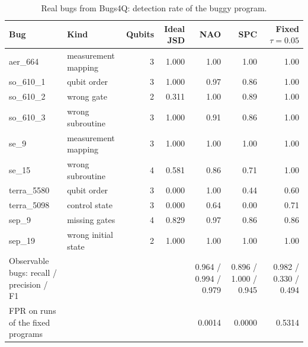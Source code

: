 \begin{table}[t]
\centering
\caption{Real bugs from Bugs4Q: detection rate of the buggy program.}
\label{tab:rq4-realbugs}
\small
\begin{tabular}{llrrrrr}
\toprule
Bug & Kind & Qubits & Ideal JSD & NAO & SPC & Fixed $\tau=0.05$ \\
\midrule
aer\_664 & measurement mapping & 3 & 1.000 & 1.00 & 1.00 & 1.00 \\
so\_610\_1 & qubit order & 3 & 1.000 & 0.97 & 0.86 & 1.00 \\
so\_610\_2 & wrong gate & 2 & 0.311 & 1.00 & 0.89 & 1.00 \\
so\_610\_3 & wrong subroutine & 3 & 1.000 & 0.91 & 0.86 & 1.00 \\
se\_9 & measurement mapping & 3 & 1.000 & 1.00 & 1.00 & 1.00 \\
se\_15 & wrong subroutine & 4 & 0.581 & 0.86 & 0.71 & 1.00 \\
terra\_5580 & qubit order & 3 & 0.000 & 1.00 & 0.44 & 0.60 \\
terra\_5098 & control state & 3 & 0.000 & 0.64 & 0.00 & 0.71 \\
sep\_9 & missing gates & 4 & 0.829 & 0.97 & 0.86 & 0.86 \\
sep\_19 & wrong initial state & 2 & 1.000 & 1.00 & 1.00 & 1.00 \\
Observable bugs: recall / precision / F1 &  &  &  & 0.964 / 0.994 / 0.979 & 0.896 / 1.000 / 0.945 & 0.982 / 0.330 / 0.494 \\
FPR on runs of the fixed programs &  &  &  & 0.0014 & 0.0000 & 0.5314 \\
\bottomrule
\end{tabular}
\end{table}
